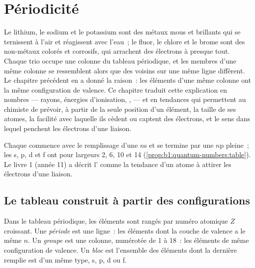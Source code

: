 \chapter{Périodicité}\label{ch:b1:periodicity}

Le lithium, le sodium et le potassium sont des métaux mous et brillants
qui se ternissent à l'air et réagissent avec l'eau~; le fluor, le chlore
et le brome sont des non-métaux colorés et corrosifs, qui arrachent des
électrons à presque tout. Chaque trio occupe une colonne du tableau
périodique, et les membres d'une même colonne se ressemblent alors que
des voisins sur une même ligne diffèrent. Le chapitre précédent en a
donné la raison~: les éléments d'une même colonne ont la même
configuration de valence. Ce chapitre traduit cette explication en
nombres --- rayons, énergies d'ionisation, ,
 --- et en tendances qui permettent au chimiste de
prévoir, à partir de la seule position d'un élément, la taille de ses
atomes, la facilité avec laquelle ils cèdent ou captent des électrons,
et le sens dans lequel penchent les électrons d'une liaison.

\begin{recall}
Chaque  commence avec le remplissage d'une  $n$s et se
termine par une  $n$p pleine~; les  s, p, d et f ont pour
largeurs 2, 6, 10 et 14 (\cref{prop:b1:quantum-numbers:table}). Le
livre 1 (année 11) a décrit l' comme la tendance d'un
atome à attirer les électrons d'une liaison.
\end{recall}

\section{Le tableau construit à partir des configurations}

\begin{definition}\label{def:b1:periodicity:table}
Dans le tableau périodique, les éléments sont rangés par numéro atomique
$Z$ croissant. Une \emph{période} est une ligne~: les éléments dont
la couche de valence a le même  $n$. Un
\emph{groupe} est une colonne, numérotée de 1 à 18~: les éléments
de même configuration de valence. Un \emph{bloc} est
l'ensemble des éléments dont la dernière  remplie est d'un
même type, s, p, d ou f.
\end{definition}

